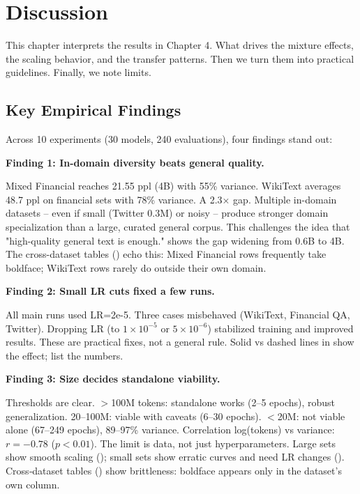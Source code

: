 \chapter{Discussion}

This chapter interprets the results in Chapter 4. What drives the mixture effects, the scaling behavior, and the transfer patterns. Then we turn them into practical guidelines. Finally, we note limits.

\section{Key Empirical Findings}

Across 10 experiments (30 models, 240 evaluations), four findings stand out:

\textbf{Finding 1: In-domain diversity beats general quality.}

Mixed Financial reaches 21.55 ppl (4B) with 55\% variance. WikiText averages 48.7 ppl on financial sets with 78\% variance. A 2.3$\times$ gap. Multiple in-domain datasets -- even if small (Twitter 0.3M) or noisy -- produce stronger domain specialization than a large, curated general corpus. This challenges the idea that "high-quality general text is enough."  shows the gap widening from 0.6B to 4B. The cross-dataset tables () echo this: Mixed Financial rows frequently take boldface; WikiText rows rarely do outside their own domain.

\textbf{Finding 2: Small LR cuts fixed a few runs.}

All main runs used LR=2e-5. Three cases misbehaved (WikiText, Financial QA, Twitter). Dropping LR (to $1\times10^{-5}$ or $5\times10^{-6}$) stabilized training and improved results. These are practical fixes, not a general rule. Solid vs dashed lines in  show the effect;  list the numbers.

\textbf{Finding 3: Size decides standalone viability.}

Thresholds are clear. $>$100M tokens: standalone works (2–5 epochs), robust generalization. 20–100M: viable with caveats (6–30 epochs). $<$20M: not viable alone (67–249 epochs), 89–97\% variance. Correlation log(tokens) vs variance: $r = -0.78$ ($p < 0.01$). The limit is data, not just hyperparameters. Large sets show smooth scaling (); small sets show erratic curves and need LR changes (). Cross‑dataset tables () show brittleness: boldface appears only in the dataset’s own column.

